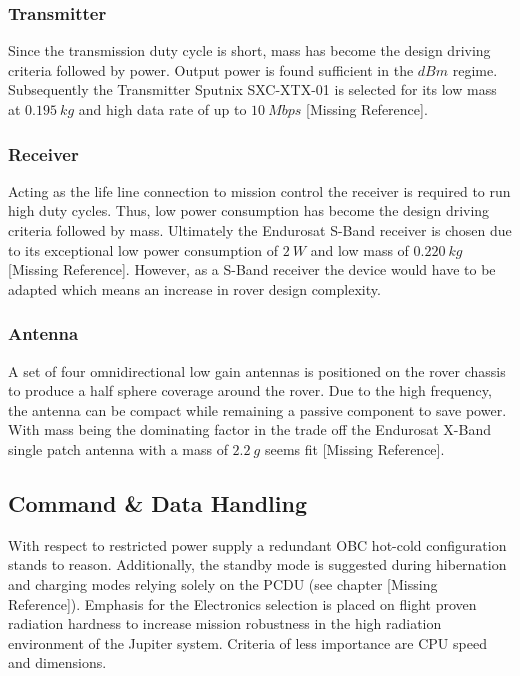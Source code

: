 \subsubsection{Transmitter}

Since the transmission duty cycle is short, mass has become the design driving criteria followed by power. Output power is found sufficient in the $dBm$ regime. 
Subsequently the Transmitter Sputnix SXC-XTX-01 is selected for its low mass at $0.195\ kg$ and high data rate of up to $10\ Mbps$ [Missing Reference]. 

\subsubsection{Receiver}

Acting as the life line connection to mission control the receiver is required to run high duty cycles. Thus, low power consumption has become the design driving criteria followed by mass. Ultimately the Endurosat S-Band receiver is chosen due to its exceptional low power consumption of $2\ W$ and low mass of $0.220\ kg$ [Missing Reference]. However, as a S-Band receiver the device would have to be adapted which means an increase in rover design complexity.

\subsubsection{Antenna}

A set of four omnidirectional low gain antennas is positioned on the rover chassis to produce a half sphere coverage around the rover. Due to the high frequency, the antenna can be compact while remaining a passive component to save power. With mass being the dominating factor in the trade off the Endurosat X-Band single patch antenna with a mass of $2.2\ g$ seems fit [Missing Reference].

 \subsection{Command \& Data Handling}
 
 With respect to restricted power supply a redundant OBC hot-cold configuration stands to reason. Additionally, the standby mode is suggested during hibernation and charging modes relying solely on the PCDU (see chapter [Missing Reference]). 
Emphasis for the Electronics selection is placed on flight proven radiation hardness to increase mission robustness in the high radiation environment of the Jupiter system. 
Criteria of less importance are CPU speed and dimensions. \\

